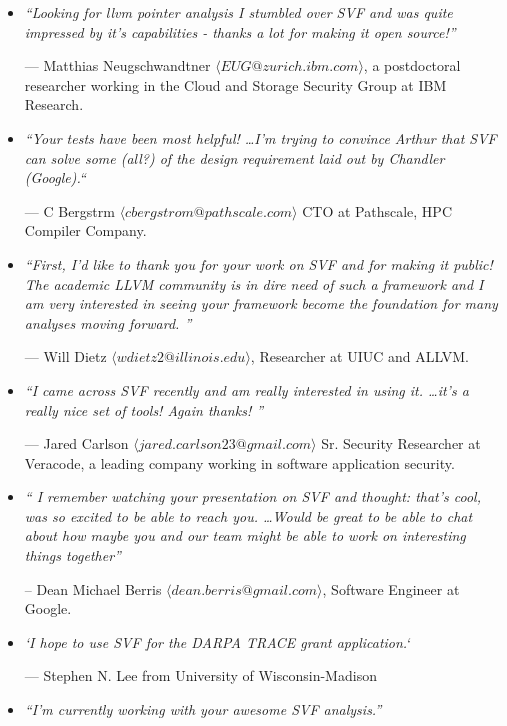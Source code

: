\documentclass[12pt]{article}
\begin{document}
\begin{itemize}
\item 
\emph{``Looking for llvm pointer analysis I stumbled over SVF and was quite impressed by it's capabilities - thanks a lot for making it open source!''}

\qquad --- Matthias Neugschwandtner $\langle EUG@zurich.ibm.com\rangle$, a postdoctoral researcher working in the Cloud and Storage Security Group at IBM Research.

\item 
\emph{``Your tests have been most helpful! \dots I'm trying to convince Arthur that SVF can solve some (all?) of the design requirement laid out by Chandler (Google).``}

\qquad --- C Bergstrm $\langle cbergstrom@pathscale.com\rangle$ CTO at Pathscale, HPC Compiler Company. 

\item
\emph{``First, I'd like to thank you for your work on SVF and for making it public!  The academic LLVM community is in dire need of such a framework and I am very interested in seeing your framework become the foundation for many analyses moving forward. ''}

\qquad --- Will Dietz $\langle wdietz2@illinois.edu \rangle$, Researcher at UIUC and ALLVM.

\item
\emph{``I came across SVF recently and am really interested in using it.  \dots it's a really nice set of tools!  Again thanks! ''}

\qquad --- Jared Carlson $\langle jared.carlson23@gmail.com \rangle$ Sr. Security Researcher at Veracode, a leading company working in software application security.

\item
\emph{`` I remember watching your presentation on SVF and thought: that's cool, was so excited to be able to reach you. \dots Would be great to be able to chat about how maybe you and our team might be able to work on interesting things together''}

\qquad -- Dean Michael Berris $\langle dean.berris@gmail.com \rangle$, Software Engineer at Google.

\item
\emph{`I hope to use SVF for the DARPA TRACE grant application.`}

\qquad --- Stephen N. Lee from University of Wisconsin-Madison
 
 
\item
 \emph{``I'm currently working with your awesome SVF analysis.''}
 

\end{itemize}
\end{document}
